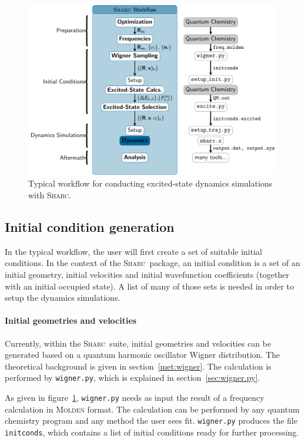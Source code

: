 \documentclass[a4paper,11pt,DIV=15,openany,twoside=false]{scrbook}
\newcommand{\sharc}{\textsc{Sharc}}
\newcommand{\ttt}[1]{\texttt{#1}}
\begin{document}
\begin{figure}[h!]
  \centering
  \includegraphics[scale=1]{img/workflow/prepare.pdf}
  \caption{Typical workflow for conducting excited-state dynamics simulations with \sharc.}
  \label{fig:workflow}
\end{figure}

\subsection{Initial condition generation}

In the typical workflow, the user will first create a set of suitable initial conditions. In the context of the \sharc\ package, an initial condition is a set of an initial geometry, initial velocities and initial wavefunction coefficients (together with an initial occupied state). 
A list of many of those sets is needed in order to setup the dynamics simulations.

\paragraph{Initial geometries and velocities}

Currently, within the \sharc\ suite, initial geometries and velocities can be generated based on a quantum harmonic oscillator Wigner distribution. The theoretical background is given in section~\ref{met:wigner}. The calculation is performed by \ttt{wigner.py}, which is explained in section~\ref{sec:wigner.py}. 

As given in figure~\ref{fig:workflow}, \ttt{wigner.py} needs as input the result of a frequency calculation in \textsc{Molden} format. The calculation can be performed by any quantum chemistry program and any method the user sees fit. 
\ttt{wigner.py} produces the file \ttt{initconds}, which contains a list of initial conditions ready for further processing.
\end{document}
